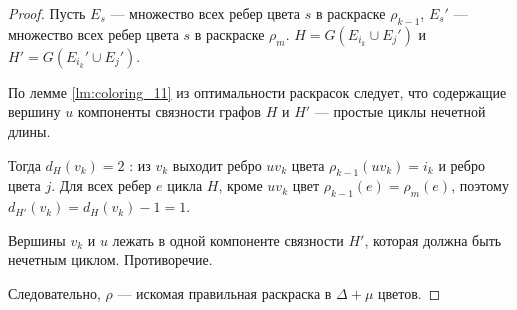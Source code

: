 \begin{proof}
Пусть $E_s$ --- множество всех ребер цвета $s$ в раскраске $\rho_{k-1}$, $E_s' $ --- множество всех ребер цвета $s$ в раскраске $\rho_m$. $H = G(E_{i_k} \cup E_j')$ и $H' = G(E_{i_k}' \cup E_j')$.

По лемме \ref{lm:coloring_11} из оптимальности раскрасок следует, что содержащие вершину $u$ компоненты связности графов $H$ и $H'$ --- простые циклы нечетной длины.

Тогда $d_{H}(v_k) = 2$ : из $v_k$ выходит ребро $uv_k$ цвета $\rho_{k-1}(uv_k) = i_k$ и ребро цвета $j$. Для всех ребер $e$ цикла $H$, кроме $uv_k$ цвет $\rho_{k-1}(e) = \rho_m(e)$, поэтому $d_{H'}(v_k) = d_{H}(v_k) - 1 = 1$. 

Вершины $v_k$ и $u$ лежать в одной компоненте связности $H'$, которая должна быть нечетным циклом. Противоречие. 

Следовательно, $\rho$ --- искомая правильная раскраска в $\Delta + \mu$ цветов.
\end{proof}
